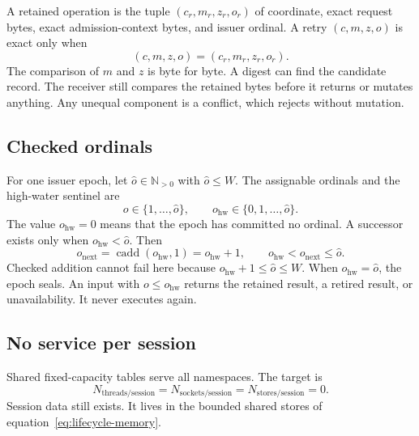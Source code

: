 \documentclass[11pt,a4paper]{article}
\theoremstyle{definition}
\newcommand{\cadd}{\operatorname{cadd}}
\begin{document}
A retained operation is the tuple $(c_r,m_r,z_r,o_r)$ of coordinate, exact request
bytes, exact admission-context bytes, and issuer ordinal. A retry $(c,m,z,o)$ is exact
only when
\begin{equation}\label{eq:exact-retry}
(c,m,z,o)=(c_r,m_r,z_r,o_r).
\end{equation}
The comparison of $m$ and $z$ is byte for byte. A digest can find the candidate record.
The receiver still compares the retained bytes before it returns or mutates anything.
Any unequal component is a conflict, which rejects without mutation.

\subsection{Checked ordinals}

For one issuer epoch, let $\hat o\in\mathbb{N}_{>0}$ with $\hat o\leq W$. The assignable
ordinals and the high-water sentinel are
\begin{equation}\label{eq:ordinal-domain}
o\in\{1,\ldots,\hat o\},\qquad o_{\mathrm{hw}}\in\{0,1,\ldots,\hat o\}.
\end{equation}
The value $o_{\mathrm{hw}}=0$ means that the epoch has committed no ordinal. A successor
exists only when $o_{\mathrm{hw}}<\hat o$. Then
\begin{equation}\label{eq:ordinal-successor}
o_{\mathrm{next}}=\cadd(o_{\mathrm{hw}},1)=o_{\mathrm{hw}}+1,\qquad
o_{\mathrm{hw}}<o_{\mathrm{next}}\leq\hat o.
\end{equation}
Checked addition cannot fail here because $o_{\mathrm{hw}}+1\leq\hat o\leq W$. When
$o_{\mathrm{hw}}=\hat o$, the epoch seals. An input with $o\leq o_{\mathrm{hw}}$ returns
the retained result, a retired result, or unavailability. It never executes again.

\subsection{No service per session}

Shared fixed-capacity tables serve all namespaces. The target is
\begin{equation}\label{eq:no-service}
N_{\mathrm{threads/session}}=N_{\mathrm{sockets/session}}
=N_{\mathrm{stores/session}}=0.
\end{equation}
Session data still exists. It lives in the bounded shared stores of
equation~\eqref{eq:lifecycle-memory}.

\end{document}
